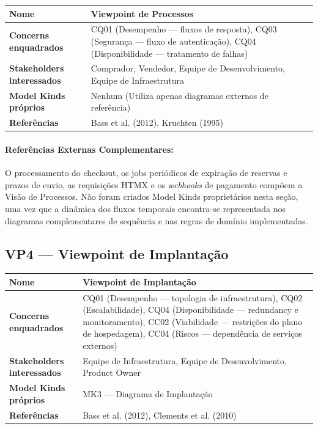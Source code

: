 ﻿\documentclass[12pt,a4paper]{article}
\begin{document}
\begin{longtable}{|p{4.5cm}|p{10cm}|}
\hline
\textbf{Nome} & Viewpoint de Processos \\
\hline
\textbf{Concerns enquadrados} & CQ01 (Desempenho --- fluxos de resposta), CQ03 (Segurança --- fluxo de autenticação), CQ04 (Disponibilidade --- tratamento de falhas) \\
\hline
\textbf{Stakeholders interessados} & Comprador, Vendedor, Equipe de Desenvolvimento, Equipe de Infraestrutura \\
\hline
\textbf{Model Kinds próprios} & Nenhum (Utiliza apenas diagramas externos de referência) \\
\hline
\textbf{Referências} & Bass et al. (2012), Kruchten (1995) \\
\hline
\end{longtable}

\paragraph{Referências Externas Complementares:} O processamento do checkout, os jobs periódicos de expiração de reservas e prazos de envio, as requisições HTMX e os \textit{webhooks} de pagamento compõem a Visão de Processos. Não foram criados Model Kinds proprietários nesta seção, uma vez que a dinâmica dos fluxos temporais encontra-se representada nos diagramas complementares de sequência e nas regras de domínio implementadas.

\subsection{VP4 --- Viewpoint de Implantação}

\begin{longtable}{|p{4.5cm}|p{10cm}|}
\hline
\textbf{Nome} & Viewpoint de Implantação \\
\hline
\textbf{Concerns enquadrados} & CQ01 (Desempenho --- topologia de infraestrutura), CQ02 (Escalabilidade), CQ04 (Disponibilidade --- redundancy e monitoramento), CC02 (Viabilidade --- restrições do plano de hospedagem), CC04 (Riscos --- dependência de serviços externos) \\
\hline
\textbf{Stakeholders interessados} & Equipe de Infraestrutura, Equipe de Desenvolvimento, Product Owner \\
\hline
\textbf{Model Kinds próprios} & MK3 --- Diagrama de Implantação \\
\hline
\textbf{Referências} & Bass et al. (2012), Clements et al. (2010) \\
\hline
\end{longtable}
\end{document}
